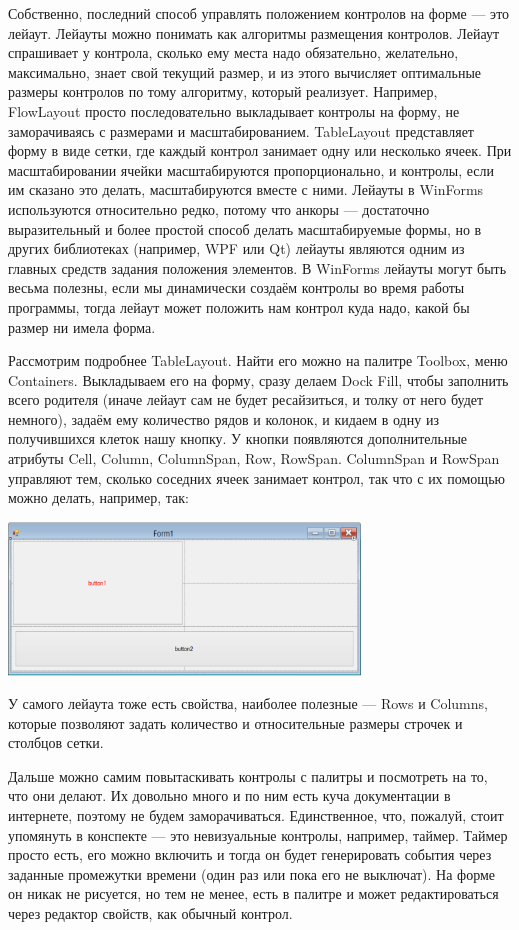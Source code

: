 \documentclass[a5paper]{article}
\begin{document}
Собственно, последний способ управлять положением контролов на форме --- это лейаут. Лейауты можно понимать как алгоритмы размещения контролов. Лейаут спрашивает у контрола, сколько ему места надо обязательно, желательно, максимально, знает свой текущий размер, и из этого вычисляет оптимальные размеры контролов по тому алгоритму, который реализует. Например, FlowLayout просто последовательно выкладывает контролы на форму, не заморачиваясь с размерами и масштабированием. TableLayout представляет форму в виде сетки, где каждый контрол занимает одну или несколько ячеек. При масштабировании ячейки масштабируются пропорционально, и контролы, если им сказано это делать, масштабируются вместе с ними. Лейауты в WinForms используются относительно редко, потому что анкоры --- достаточно выразительный и более простой способ делать масштабируемые формы, но в других библиотеках (например, WPF или Qt) лейауты являются одним из главных средств задания положения элементов. В WinForms лейауты могут быть весьма полезны, если мы динамически создаём контролы во время работы программы, тогда лейаут может положить нам контрол куда надо, какой бы размер ни имела форма.

Рассмотрим подробнее TableLayout. Найти его можно на палитре Toolbox, меню Containers. Выкладываем его на форму, сразу делаем Dock Fill, чтобы заполнить всего родителя (иначе лейаут сам не будет ресайзиться, и толку от него будет немного), задаём ему количество рядов и колонок, и кидаем в одну из получившихся клеток нашу кнопку. У кнопки появляются дополнительные атрибуты Cell, Column, ColumnSpan, Row, RowSpan. ColumnSpan и RowSpan управляют тем, сколько соседних ячеек занимает контрол, так что с их помощью можно делать, например, так:

\begin{center}
    \includegraphics[width=0.7\textwidth]{gridLayout.png}
\end{center}

У самого лейаута тоже есть свойства, наиболее полезные --- Rows и Columns, которые позволяют задать количество и относительные размеры строчек и столбцов сетки.

Дальше можно самим повытаскивать контролы с палитры и посмотреть на то, что они делают. Их довольно много и по ним есть куча документации в интернете, поэтому не будем заморачиваться. Единственное, что, пожалуй, стоит упомянуть в конспекте --- это невизуальные контролы, например, таймер. Таймер просто есть, его можно включить и тогда он будет генерировать события через заданные промежутки времени (один раз или пока его не выключат). На форме он никак не рисуется, но тем не менее, есть в палитре и может редактироваться через редактор свойств, как обычный контрол.
\end{document}
